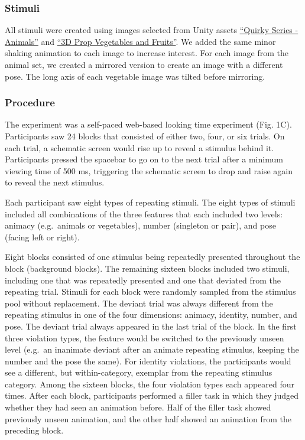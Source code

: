 \documentclass[10pt, letterpaper]{article}
\begin{document}
\hypertarget{stimuli}{%
\subsubsection{Stimuli}\label{stimuli}}

All stimuli were created using images selected from Unity assets
\href{https://assetstore.unity.com/packages/3d/characters/animals/quirky-series-animals-mega-pack-vol-2-183280}{``Quirky
Series - Animals''} and
\href{https://assetstore.unity.com/packages/3d/props/food/3d-prop-vegetables-and-fruits-237790}{``3D
Prop Vegetables and Fruits''}. We added the same minor shaking animation
to each image to increase interest. For each image from the animal set,
we created a mirrored version to create an image with a different pose.
The long axis of each vegetable image was tilted before mirroring.

\hypertarget{procedure}{%
\subsubsection{Procedure}\label{procedure}}

The experiment was a self-paced web-based looking time experiment (Fig.
1C). Participants saw 24 blocks that consisted of either two, four, or
six trials. On each trial, a schematic screen would rise up to reveal a
stimulus behind it. Participants pressed the spacebar to go on to the
next trial after a minimum viewing time of 500 ms, triggering the
schematic screen to drop and raise again to reveal the next stimulus.

Each participant saw eight types of repeating stimuli. The eight types
of stimuli included all combinations of the three features that each
included two levels: animacy (e.g.~animals or vegetables), number
(singleton or pair), and pose (facing left or right).

Eight blocks consisted of one stimulus being repeatedly presented
throughout the block (background blocks). The remaining sixteen blocks
included two stimuli, including one that was repeatedly presented and
one that deviated from the repeating trial. Stimuli for each block were
randomly sampled from the stimulus pool without replacement. The deviant
trial was always different from the repeating stimulus in one of the
four dimensions: animacy, identity, number, and pose. The deviant trial
always appeared in the last trial of the block. In the first three
violation types, the feature would be switched to the previously unseen
level (e.g.~an inanimate deviant after an animate repeating stimulus,
keeping the number and the pose the same). For identity violations, the
participants would see a different, but within-category, exemplar from
the repeating stimulus category. Among the sixteen blocks, the four
violation types each appeared four times. After each block, participants
performed a filler task in which they judged whether they had seen an
animation before. Half of the filler task showed previously unseen
animation, and the other half showed an animation from the preceding
block.
\end{document}

